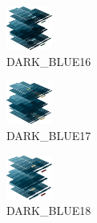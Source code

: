 \hspace{0.1cm}
\begin{minipage}[b]{0.15\linewidth}
\begin{figure}[H]                                                          
  \centering                                                             
  \begin{adjustbox}{width=1.5cm,center}                                   
  \includegraphics[width=1.5cm]{src/colorspace_colourflow/flows/colourflow_160-45.png}%
  \end{adjustbox}                                                        
\caption*{DARK\_BLUE16}                                           
\end{figure}                                                               
\end{minipage}
\hspace{0.1cm}
\begin{minipage}[b]{0.15\linewidth}
\begin{figure}[H]                                                          
  \centering                                                             
  \begin{adjustbox}{width=1.5cm,center}                                   
  \includegraphics[width=1.5cm]{src/colorspace_colourflow/flows/colourflow_161-45.png}%
  \end{adjustbox}                                                        
\caption*{DARK\_BLUE17}                                           
\end{figure}                                                               
\end{minipage}
\hspace{0.1cm}
\begin{minipage}[b]{0.15\linewidth}
\begin{figure}[H]                                                          
  \centering                                                             
  \begin{adjustbox}{width=1.5cm,center}                                   
  \includegraphics[width=1.5cm]{src/colorspace_colourflow/flows/colourflow_162-45.png}%
  \end{adjustbox}                                                        
\caption*{DARK\_BLUE18}                                           
\end{figure}                                                               
\end{minipage}
